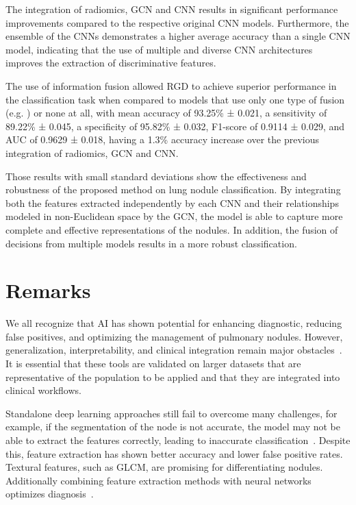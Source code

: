 The integration of radiomics, GCN and CNN results in significant performance improvements compared to the respective original CNN models. Furthermore, the ensemble of the CNNs demonstrates a higher average accuracy than a single CNN model, indicating that the use of multiple and diverse CNN architectures improves the extraction of discriminative features.

The use of information fusion allowed RGD to achieve superior performance in the classification task when compared to models that use only one type of fusion (e.g. \cite{xie_fusing_2018}) or none at all, with mean accuracy of 93.25\% ± 0.021, a sensitivity of 89.22\% ± 0.045, a specificity of 95.82\% ± 0.032, F1-score of 0.9114 ± 0.029, and AUC of 0.9629 ± 0.018, having a 1.3\% accuracy increase over the previous integration of radiomics, GCN and CNN.

Those results with small standard deviations show the effectiveness and robustness of the proposed method on lung nodule classification. By integrating both the features extracted independently by each CNN and their relationships modeled in non-Euclidean space by the GCN, the model is able to capture more complete and effective representations of the nodules. In addition, the fusion of decisions from multiple models results in a more robust classification.


\section{Remarks}

We all recognize that AI has shown potential for enhancing diagnostic, reducing false positives, and optimizing the management of pulmonary nodules. However, generalization, interpretability, and clinical integration remain major obstacles~\cite{liu_artificial_2022}. It is essential that these tools are validated on larger datasets that are representative of the population to be applied and that they are integrated into clinical workflows.~\cite{wu_ai-enhanced_2024}

Standalone deep learning approaches still fail to overcome many challenges, for example, if the segmentation of the node is not accurate, the model may not be able to extract the features correctly, leading to inaccurate classification~\cite{gu_survey_2021, shaffie_generalized_2018}. Despite this, feature extraction has shown better accuracy and lower false positive rates. Textural features, such as GLCM, are promising for differentiating nodules. Additionally combining feature extraction methods with neural networks optimizes diagnosis~\cite{mathumetha_feature_2024}.

